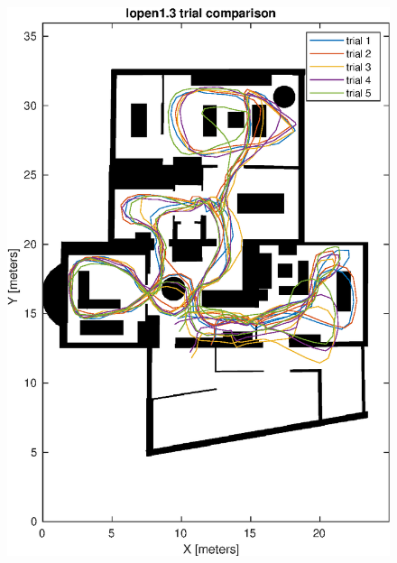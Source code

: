 \begin{figure}[H]
	\centering
	\begin{minipage}{.45\textwidth}
		\centering
		\includegraphics[width=\linewidth]{images/20201107_1142_trial_comparison_3}
		\caption{}
		\label{fig:202011071142trialcomparison3}
	\end{minipage}%
	\begin{minipage}{.45\textwidth}
		\centering

\end{minipage}
\end{figure}
